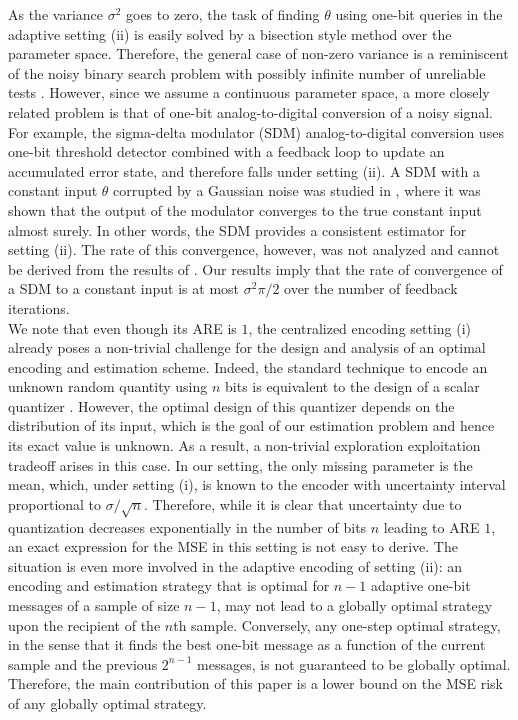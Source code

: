 \documentclass[letterpaper, conference,9pt]{IEEEtran}      %
\begin{document}
As the variance $\sigma^2$ goes to zero, the task of finding $\theta$ using one-bit queries in the adaptive setting (ii) is easily solved by a bisection style method over the parameter space. Therefore, the general case of non-zero variance is a reminiscent of the noisy binary search problem with possibly infinite number of unreliable tests \cite{cicalese2002least, Karp:2007:NBS:1283383.1283478}. However, since we assume a continuous parameter space, a more closely related problem is that of one-bit analog-to-digital conversion of a noisy signal. For example, the sigma-delta modulator (SDM) analog-to-digital conversion \cite{1092194} uses one-bit threshold detector combined with a feedback loop to update an accumulated error state, and therefore falls under setting (ii). A SDM with a constant input $\theta$ corrupted by a Gaussian noise was studied in \cite{53738}, where it was shown that the output of the modulator converges to the true constant input almost surely. In other words, the SDM provides a consistent estimator for setting (ii). The rate of this convergence, however, was not analyzed and cannot be derived from the results of \cite{53738}. Our results imply that the rate of convergence of a SDM to a constant input is at most $\sigma^2\pi/2$ over the number of feedback iterations. \\

We note that even though its ARE is $1$, the centralized encoding setting (i) already poses a non-trivial challenge for the design and analysis of an optimal encoding and estimation scheme. Indeed, the standard technique to encode an unknown random quantity using $n$ bits is equivalent to the design of a scalar quantizer \cite{gray1998quantization}. However, the optimal design of this quantizer depends on the distribution of its input, which is the goal of our estimation problem and hence its exact value is unknown. As a result, a non-trivial exploration exploitation tradeoff arises in this case. In our setting, the only missing parameter is the mean, which, under setting (i), is known to the encoder with uncertainty interval proportional to $\sigma/\sqrt{n}$. Therefore, while it is clear that uncertainty due to quantization decreases exponentially in the number of bits $n$ leading to ARE $1$, an exact expression for the MSE in this setting is not easy to derive. The situation is even more involved in the adaptive encoding of setting (ii): an encoding and estimation strategy that is optimal for $n-1$ adaptive one-bit messages of a sample of size $n-1$, may not lead to a globally optimal strategy upon the recipient of the $n$th sample. Conversely, any one-step optimal strategy, in the sense that it finds the best one-bit message as a function of the current sample and the previous $2^{n-1}$ messages, is not guaranteed to be globally optimal. Therefore, the main contribution of this paper is a lower bound on the MSE risk of any globally optimal strategy. \\
\end{document}
